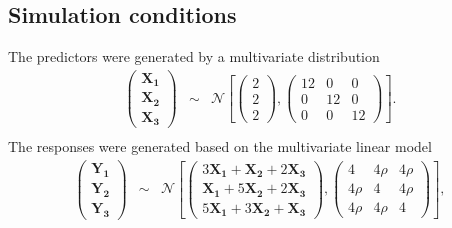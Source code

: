	\subsection{Simulation conditions}
	The predictors were generated by a multivariate distribution  
	\begin{eqnarray*}
		\begin{pmatrix}\boldsymbol{X_{1}}\\
			\boldsymbol{X_{2}}\\
			\boldsymbol{X_{3}}
		\end{pmatrix} & \sim & \mathcal{N}\left[\left(\begin{array}{c}
			2\\
			2\\
			2
		\end{array}\right),\left(\begin{array}{ccc}
			12 & 0 & 0\\
			0 & 12 & 0\\
			0 & 0 & 12
		\end{array}\right)\right].\\
	\end{eqnarray*}
	The responses were generated based on the multivariate linear model
	\begin{eqnarray*}
		\begin{pmatrix}\boldsymbol{Y_{1}}\\
			\boldsymbol{Y_{2}}\\
			\boldsymbol{Y_{3}}
		\end{pmatrix} & \sim & \mathcal{N}\left[\left(\begin{array}{c}
			3\boldsymbol{X_1} + \boldsymbol{X_2} + 2\boldsymbol{X_{3}}\\
			\boldsymbol{X_{1}} + 5\boldsymbol{X_{2}} + 2\boldsymbol{X_{3}}\\
			5\boldsymbol{X_{1}} + 3\boldsymbol{X_{2}} + \boldsymbol{X_{3}}
		\end{array}\right),\left(\begin{array}{ccc}
			4 & 4\rho & 4\rho\\
			4\rho & 4 & 4\rho\\
			4\rho & 4\rho & 4
		\end{array}\right)\right],\\
	\end{eqnarray*}
